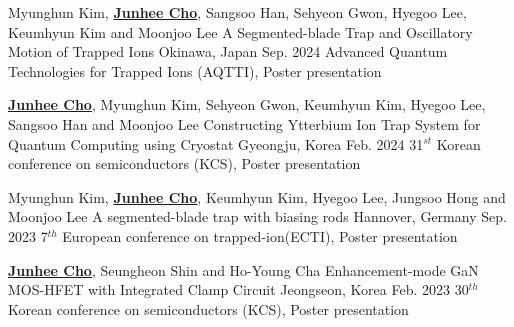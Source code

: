
\begin{cventries}

  \cventry
    {Myunghun Kim, \underline{\textbf{Junhee Cho}}, Sangsoo Han, Sehyeon Gwon, Hyegoo Lee, Keumhyun Kim and Moonjoo Lee} %
    {A Segmented-blade Trap and Oscillatory Motion of Trapped Ions} %
    {Okinawa, Japan} %
    {Sep. 2024} %
    {Advanced Quantum Technologies for Trapped Ions (AQTTI), Poster presentation}

  \cventry
    {\underline{\textbf{Junhee Cho}}, Myunghun Kim, Sehyeon Gwon, Keumhyun Kim, Hyegoo Lee, Sangsoo Han and Moonjoo Lee} %
    {Constructing Ytterbium Ion Trap System for Quantum Computing using Cryostat} %
    {Gyeongju, Korea} %
    {Feb. 2024} %
    {31$^{st}$ Korean conference on semiconductors (KCS), Poster presentation}

  \cventry
    {Myunghun Kim, \underline{\textbf{Junhee Cho}}, Keumhyun Kim, Hyegoo Lee, Jungsoo Hong and Moonjoo Lee} %
    {A segmented-blade trap with biasing rods} %
    {Hannover, Germany} %
    {Sep. 2023} %
    {7$^{th}$ European conference on trapped-ion(ECTI), Poster presentation}

  \cventry
    {\underline{\textbf{Junhee Cho}}, Seungheon Shin and Ho-Young Cha} %
    {Enhancement-mode GaN MOS-HFET with Integrated Clamp Circuit} %
    {Jeongseon, Korea} %
    {Feb. 2023} %
    {30$^{th}$ Korean conference on semiconductors (KCS), Poster presentation}

  \vspace{0.3cm}
\end{cventries}
